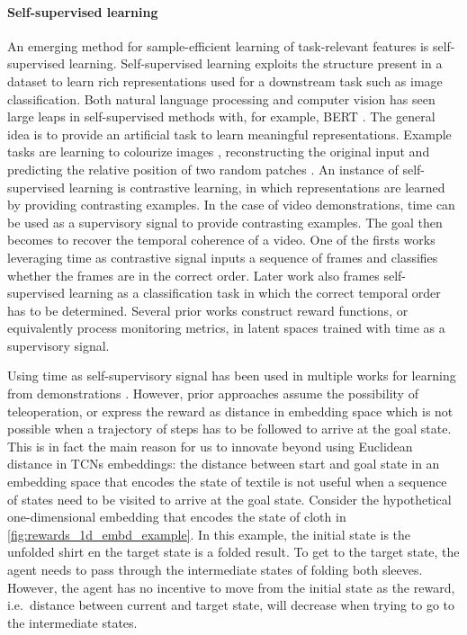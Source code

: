 \documentclass[\home/main.tex]{subfiles}
\begin{document}
\paragraph{Self-supervised learning}
An emerging method for sample-efficient learning of task-relevant features is self-supervised learning. Self-supervised learning exploits the structure present in a dataset to learn rich representations used for a downstream task such as image classification. Both natural language processing and computer vision has seen large leaps in self-supervised methods with, for example, BERT \autocite{Devlin2018}. The general idea is to provide an artificial task to learn meaningful representations. Example tasks are learning to colourize images \autocite{Zhang2016Color}, reconstructing the original input \autocite{Pathak2016} and predicting the relative position of two random patches \autocite{Doersch2015}. An instance of self-supervised learning is contrastive learning, in which representations are learned by providing contrasting examples. In the case of video demonstrations, time can be used as a supervisory signal to provide contrasting examples. The goal then becomes to recover the temporal coherence of a video. One of the firsts works leveraging time as contrastive signal \autocite{Misra2016} inputs a sequence of frames and classifies whether the frames are in the correct order. Later work \autocite{Lee2017,Fernando2017} also frames self-supervised learning as a classification task in which the correct temporal order has to be determined.
Several prior works construct reward functions, or equivalently process monitoring metrics, in latent spaces trained with time as a supervisory signal.

Using time as self-supervisory signal has been used in multiple works for learning from demonstrations \autocite{Nair2018time,Nair2018visual,Sermanet2017TCN,Dwibedi2018mfTCN,Hartikainen2019}. However, prior approaches assume the possibility of teleoperation, or express the reward as distance in embedding space which is not possible when a trajectory of steps has to be followed to arrive at the goal state. This is in fact the main reason for us to innovate beyond using Euclidean distance in \glspl{TCN} embeddings: the distance between start and goal state in an embedding space that encodes the state of textile is not useful when a sequence of states need to be visited to arrive at the goal state. Consider the hypothetical one-dimensional embedding that encodes the state of cloth in \cref{fig:rewards_1d_embd_example}. In this example, the initial state is the unfolded shirt en the target state is a folded result. To get to the target state, the agent needs to pass through the intermediate states of folding both sleeves. However, the agent has no incentive to move from the initial state as the reward, i.e.\ distance between current and target state, will decrease when trying to go to the intermediate states.
\end{document}
